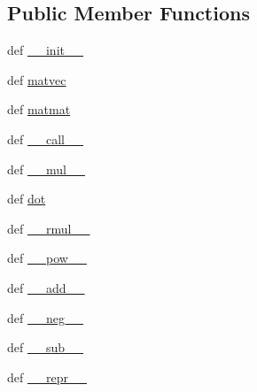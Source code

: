 \subsection*{Public Member Functions}
\begin{DoxyCompactItemize}
\item 
def \hyperlink{classscipy_1_1sparse_1_1linalg_1_1interface_1_1LinearOperator_a1e2b16484de5bb7babc11dc97ec6e243}{\+\_\+\+\_\+init\+\_\+\+\_\+}
\item 
def \hyperlink{classscipy_1_1sparse_1_1linalg_1_1interface_1_1LinearOperator_a6ac4dba9f22946354ea84cc70d713f3c}{matvec}
\item 
def \hyperlink{classscipy_1_1sparse_1_1linalg_1_1interface_1_1LinearOperator_aa7cf698a4976e186eac3c973bc9bda0d}{matmat}
\item 
def \hyperlink{classscipy_1_1sparse_1_1linalg_1_1interface_1_1LinearOperator_a3d85527e5d82d5a1e479e5b39c33284c}{\+\_\+\+\_\+call\+\_\+\+\_\+}
\item 
def \hyperlink{classscipy_1_1sparse_1_1linalg_1_1interface_1_1LinearOperator_ae4e6cb125d94031da70639b0d1f91dcc}{\+\_\+\+\_\+mul\+\_\+\+\_\+}
\item 
def \hyperlink{classscipy_1_1sparse_1_1linalg_1_1interface_1_1LinearOperator_ac8b0a17ccedf4bae1dbb510c7af64c6f}{dot}
\item 
def \hyperlink{classscipy_1_1sparse_1_1linalg_1_1interface_1_1LinearOperator_a174177a38046ad148576dea774f6e5c5}{\+\_\+\+\_\+rmul\+\_\+\+\_\+}
\item 
def \hyperlink{classscipy_1_1sparse_1_1linalg_1_1interface_1_1LinearOperator_aa2eac3a8ff4a2975df8e3caa8cfed3d5}{\+\_\+\+\_\+pow\+\_\+\+\_\+}
\item 
def \hyperlink{classscipy_1_1sparse_1_1linalg_1_1interface_1_1LinearOperator_aad69e1f655616561864c1cab592ec712}{\+\_\+\+\_\+add\+\_\+\+\_\+}
\item 
def \hyperlink{classscipy_1_1sparse_1_1linalg_1_1interface_1_1LinearOperator_af7ff8c730d741e338811dcac1927ba45}{\+\_\+\+\_\+neg\+\_\+\+\_\+}
\item 
def \hyperlink{classscipy_1_1sparse_1_1linalg_1_1interface_1_1LinearOperator_aba3372358470084e6cd5bdbc60a42dbc}{\+\_\+\+\_\+sub\+\_\+\+\_\+}
\item 
def \hyperlink{classscipy_1_1sparse_1_1linalg_1_1interface_1_1LinearOperator_a65b5671d57e2825d2a9e4b7061264066}{\+\_\+\+\_\+repr\+\_\+\+\_\+}
\end{DoxyCompactItemize}
